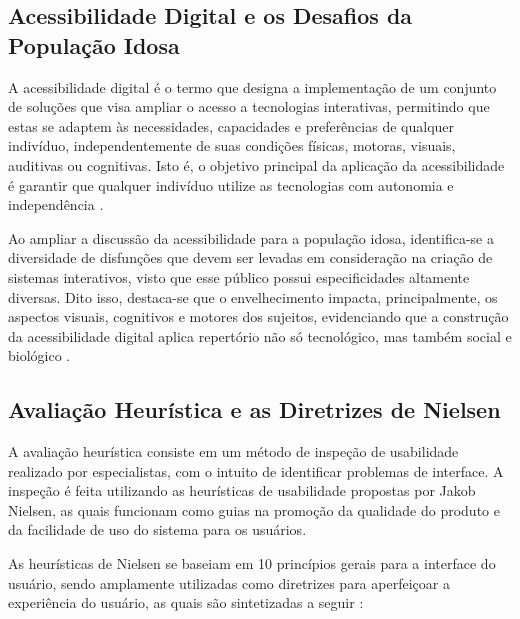\documentclass[12pt]{article}
\begin{document}
\begin{abstractp}
    

\subsection{Acessibilidade Digital e os Desafios da População Idosa} \label{acessibilidade_idoso}

A acessibilidade digital é o termo que designa a implementação de um conjunto de soluções que visa ampliar o acesso a tecnologias interativas, permitindo que estas se adaptem às necessidades, capacidades e preferências de qualquer indivíduo, independentemente de suas condições físicas, motoras, visuais, auditivas ou cognitivas. Isto é, o objetivo principal da aplicação da acessibilidade é garantir que qualquer indivíduo utilize as tecnologias com autonomia e independência \cite{brasil_acessibilidade_digital}. 

Ao ampliar a discussão da acessibilidade para a população idosa, identifica-se a diversidade de disfunções que devem ser levadas em consideração na criação de sistemas interativos, visto que esse público possui especificidades altamente diversas. Dito isso, destaca-se que o envelhecimento impacta, principalmente, os aspectos visuais, cognitivos e motores dos sujeitos, evidenciando que a construção da acessibilidade digital aplica repertório não só tecnológico, mas também social e biológico \cite{barbosa2010ihc}.

\subsection{Avaliação Heurística e as Diretrizes de Nielsen} \label{subsec:heuristica}

A avaliação heurística consiste em um método de inspeção de usabilidade realizado por especialistas, com o intuito de identificar problemas de interface. A inspeção é feita utilizando as heurísticas de usabilidade propostas por Jakob Nielsen, as quais funcionam como guias na promoção da qualidade do produto e da facilidade de uso do sistema para os usuários.

As heurísticas de Nielsen se baseiam em 10 princípios gerais para a interface do usuário, sendo amplamente utilizadas como diretrizes para aperfeiçoar a experiência do usuário, as quais são sintetizadas a seguir \cite{nielsen1994heuristic}:


\end{abstractp}
\end{document}
